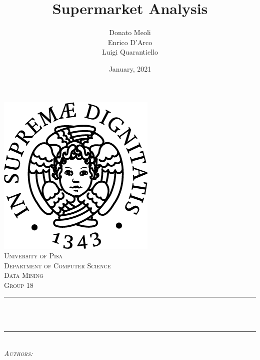 \documentclass[10pt]{article}
\title{Supermarket Analysis}
\author{Donato Meoli \\ Enrico D'Arco \\ Luigi Quarantiello}
\date{January, 2021}
\makeatletter
\let\thetitle\@title
\let\theauthor\@author
\let\thedate\@date
\makeatother
\begin{document}
\begin{titlepage}
	\centering
    \vspace*{0.5 cm}
    \includegraphics[scale = 0.5]{img/unipi.png}\\[1.0 cm]
    \textsc{\LARGE University of Pisa}\\[0.5 cm]
    \textsc{\Large Department of Computer Science}\\[1.5 cm]
	\textsc{\large Data Mining \\ Group 18}\\[0.5 cm]
	\rule{\linewidth}{0.2 mm} \\[0.4 cm]
	{ \huge \bfseries \thetitle}\\
	\rule{\linewidth}{0.2 mm} \\[1.5 cm]
	\centering \textsc{\large \emph{Authors:}}\\[0.5 cm]
	\begin{minipage}{0.4\textwidth}
		\begin{center} \large
			\textbf{\theauthor}
		\end{center}
		\end{minipage}~
		\begin{minipage}{0.4\textwidth}
	\end{minipage}\\[2 cm]
	{\large \thedate}\\[2 cm]
	\vfill
\end{titlepage}

\tableofcontents
\pagebreak


\pagebreak

\pagebreak

\clearpage

\pagebreak




\end{document}
